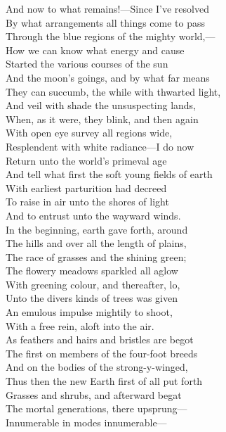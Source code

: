 And now to what remains!—Since I've resolved\\
By what arrangements all things come to pass\\
Through the blue regions of the mighty world,—\\
How we can know what energy and cause\\
Started the various courses of the sun\\
And the moon's goings, and by what far means\\
They can succumb, the while with thwarted light,\\
And veil with shade the unsuspecting lands,\\
When, as it were, they blink, and then again\\
With open eye survey all regions wide,\\
Resplendent with white radiance—I do now\\
Return unto the world's primeval age\\
And tell what first the soft young fields of earth\\
With earliest parturition had decreed\\
To raise in air unto the shores of light\\
And to entrust unto the wayward winds.\\
In the beginning, earth gave forth, around\\
The hills and over all the length of plains,\\
The race of grasses and the shining green;\\
The flowery meadows sparkled all aglow\\
With greening colour, and thereafter, lo,\\
Unto the divers kinds of trees was given\\
An emulous impulse mightily to shoot,\\
With a free rein, aloft into the air.\\
As feathers and hairs and bristles are begot\\
The first on members of the four-foot breeds\\
And on the bodies of the strong-y-winged,\\
Thus then the new Earth first of all put forth\\
Grasses and shrubs, and afterward begat\\
The mortal generations, there upsprung—\\
Innumerable in modes innumerable—\\

